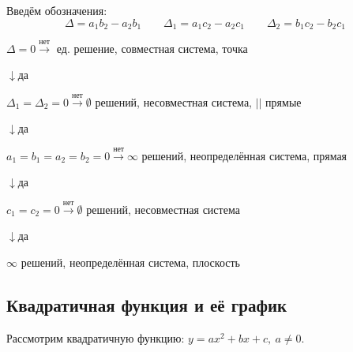 \documentclass{article}
\begin{document}
    Введём обозначения:
    \[\Delta = a_1b_2 - a_2b_1\qquad \Delta_1 = a_1c_2 - a_2c_1\qquad \Delta_2 = b_1c_2 - b_2c_1\]

    \(\Delta = 0 \overset{\textrm{нет}}{\longrightarrow}\) ед. решение, совместная система, точка

    \(\downarrow\)да

    \(\Delta_1 = \Delta_2 = 0 \overset{\textrm{нет}}{\longrightarrow} \emptyset\) решений, несовместная система, \(||\) прямые

    \(\downarrow\)да

    \(a_1 = b_1 = a_2 = b_2 = 0 \overset{\textrm{нет}}{\longrightarrow} \infty\) решений, неопределённая система, прямая

    \(\downarrow\)да

    \(c_1 = c_2 = 0 \overset{\textrm{нет}}{\longrightarrow} \emptyset\) решений, несовместная система

    \(\downarrow\)да

    \(\infty\) решений, неопределённая система, плоскость

    \subsection{Квадратичная функция и её график}

    Рассмотрим квадратичную функцию: \(y = ax^2+bx+c,\ a \not = 0\). %
\end{document}

